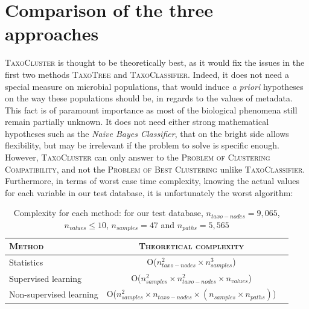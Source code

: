 \documentclass{report}
\begin{document}
\newpage

\chapter{Comparison of the three approaches}

\textsc{TaxoCluster} is thought to be theoretically best, as it would fix the issues in the first two methods \textsc{TaxoTree} and \textsc{TaxoClassifier}. Indeed, it does not need a special measure on microbial populations, that would induce \emph{a priori} hypotheses on the way these populations should be, in regards to the values of metadata. This fact is of paramount importance as most of the biological phenomena still remain partially unknown. It does not need either strong mathematical hypotheses such as the \emph{Naive Bayes Classifier}, that on the bright side allows flexibility, but may be irrelevant if the problem to solve is specific enough. However, \textsc{TaxoCluster} can only answer to the \textsc{Problem of Clustering Compatibility}, and not the \textsc{Problem of Best Clustering} unlike \textsc{TaxoClassifier}. Furthermore, in terms of worst case time complexity, knowing the actual values for each variable in our test database, it is unfortunately the worst algorithm:\\

    \begin{table}
      \caption{Complexity for each method: for our test database, $n_{taxo-nodes} = 9,065$, $n_{values} \le 10$, $n_{samples} = 47$ and $n_{paths} = 5,565$}
      \begin{tabular}{|l|c|r|}
        \hline
        \textsc{Method} & \textsc{Theoretical complexity} \\
        \hline
        Statistics & O($n_{taxo-nodes}^{2} \times n_{samples}^{3}$)\\
        \hline
        Supervised learning & O($n_{samples}^{2} \times n_{taxo-nodes}^{2} \times n_{values}$)\\
        \hline
        Non-supervised learning & O($n_{samples}^{2} \times n_{taxo-nodes}\times (n_{samples} \times n_{paths})$)\\
        \hline
      \end{tabular}
    \end{table}
\end{document}
